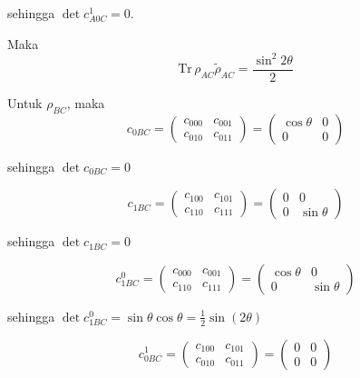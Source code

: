 sehingga $\det c_{A0C}^1 = 0$.

Maka
\begin{equation}
	\mathrm{Tr}\,\rho_{AC}\tilde{\rho}_{AC}=\frac{\sin^2 2\theta}{2}
\end{equation}

Untuk $\rho_{BC}$, maka
\begin{equation}
	c_{0BC}=
	\begin{pmatrix}
		c_{000} & c_{001} \\
		c_{010} & c_{011}
	\end{pmatrix}=
	\begin{pmatrix}
		\cos\theta & 0 \\
		0 & 0
	\end{pmatrix}
\end{equation}

sehingga $\det c_{0BC} = 0$

\begin{equation}
	c_{1BC}=
	\begin{pmatrix}
		c_{100} & c_{101} \\
		c_{110} & c_{111}
	\end{pmatrix}=
	\begin{pmatrix}
		0 & 0 \\
		0 & \sin\theta
	\end{pmatrix}
\end{equation}

sehingga $\det c_{1BC} = 0$

\begin{equation}
	c_{1BC}^0=
	\begin{pmatrix}
		c_{000} & c_{001} \\
		c_{110} & c_{111}
	\end{pmatrix}=
	\begin{pmatrix}
		\cos\theta & 0 \\
		0 & \sin\theta
	\end{pmatrix}
\end{equation}

sehingga $\det c_{1BC}^0 = \sin\theta \cos\theta = \frac{1}{2}\sin(2\theta)$

\begin{equation}
	c_{0BC}^1=
	\begin{pmatrix}
		c_{100} & c_{101} \\
		c_{010} & c_{011}
	\end{pmatrix}=
	\begin{pmatrix}
		0 & 0 \\
		0 & 0
	\end{pmatrix}
\end{equation}

